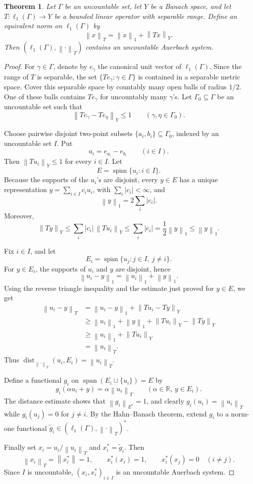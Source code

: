 \documentclass[11pt]{article}
\newtheorem{theorem}{Theorem}
\newcommand{\ellone}{\ell_1}
\newcommand{\norm}[1]{\left\lVert #1 \right\rVert}
\newcommand{\GammaSet}{\Gamma}
\begin{document}
\begin{theorem}
Let \(\GammaSet\) be an uncountable set, let \(Y\) be a Banach space, and
let \(T:\ellone(\GammaSet)\to Y\) be a bounded linear operator with separable
range.  Define an equivalent norm on \(\ellone(\GammaSet)\) by
\[
  \norm{x}_T=\norm{x}_1+\norm{Tx}_Y .
\]
Then \((\ellone(\GammaSet),\norm{\cdot}_T)\) contains an uncountable
Auerbach system.
\end{theorem}

\begin{proof}
For \(\gamma\in\GammaSet\), denote by \(e_\gamma\) the canonical unit vector
of \(\ellone(\GammaSet)\).  Since the range of \(T\) is separable, the set
\(\{Te_\gamma:\gamma\in\GammaSet\}\) is contained in a separable metric
space.  Cover this separable space by countably many open balls of radius
\(1/2\).  One of these balls contains \(Te_\gamma\) for uncountably many
\(\gamma\)'s.  Let \(\Gamma_0\subseteq\GammaSet\) be an uncountable set such
that
\[
  \norm{Te_\gamma-Te_\eta}_Y\leq 1
  \qquad(\gamma,\eta\in\Gamma_0).
\]

Choose pairwise disjoint two-point subsets
\(\{a_i,b_i\}\subseteq\Gamma_0\), indexed by an uncountable set \(I\).  Put
\[
  u_i=e_{a_i}-e_{b_i}\qquad(i\in I).
\]
Then \(\norm{T u_i}_Y\leq 1\) for every \(i\in I\).  Let
\[
  E=\overline{\operatorname{span}}\{u_i:i\in I\}.
\]
Because the supports of the \(u_i\)'s are disjoint, every \(y\in E\) has a
unique representation \(y=\sum_{i\in I} c_i u_i\), with
\(\sum_i |c_i|<\infty\), and
\[
  \norm{y}_1=2\sum_i |c_i|.
\]
Moreover,
\[
  \norm{Ty}_Y
  \leq \sum_i |c_i|\,\norm{Tu_i}_Y
  \leq \sum_i |c_i|
  =\frac12\norm{y}_1
  \leq \norm{y}_1 .
\]

Fix \(i\in I\), and let
\[
  E_i=\overline{\operatorname{span}}\{u_j:j\in I,\ j\ne i\}.
\]
For \(y\in E_i\), the supports of \(u_i\) and \(y\) are disjoint, hence
\[
  \norm{u_i-y}_1=\norm{u_i}_1+\norm{y}_1 .
\]
Using the reverse triangle inequality and the estimate just proved for
\(y\in E\), we get
\[
\begin{aligned}
  \norm{u_i-y}_T
  &= \norm{u_i-y}_1+\norm{T u_i-Ty}_Y\\
  &\geq \norm{u_i}_1+\norm{y}_1+\norm{T u_i}_Y-\norm{Ty}_Y\\
  &\geq \norm{u_i}_1+\norm{T u_i}_Y\\
  &=\norm{u_i}_T .
\end{aligned}
\]
Thus \(\operatorname{dist}_{\norm{\cdot}_T}(u_i,E_i)=\norm{u_i}_T\).

Define a functional \(g_i\) on
\(\operatorname{span}(E_i\cup\{u_i\})=E\) by
\[
  g_i(\alpha u_i+y)=\alpha \norm{u_i}_T
  \qquad(\alpha\in\mathbb{R},\ y\in E_i).
\]
The distance estimate shows that \(\norm{g_i}_{E^*}=1\), and clearly
\(g_i(u_i)=\norm{u_i}_T\) while \(g_i(u_j)=0\) for \(j\ne i\).  By the
Hahn--Banach theorem, extend \(g_i\) to a norm-one functional
\(\widetilde g_i\in(\ellone(\GammaSet),\norm{\cdot}_T)^*\).

Finally set \(x_i=u_i/\norm{u_i}_T\) and \(x_i^*=\widetilde g_i\).  Then
\[
  \norm{x_i}_T=\norm{x_i^*}=1,\qquad
  x_i^*(x_i)=1,\qquad
  x_i^*(x_j)=0\quad(i\ne j).
\]
Since \(I\) is uncountable, \((x_i,x_i^*)_{i\in I}\) is an uncountable
Auerbach system.
\end{proof}
\end{document}
